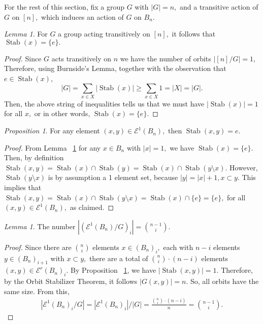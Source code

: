 \documentclass[10 pt]{amsart}
\theoremstyle{plain}
\theoremstyle{definition}
\theoremstyle{remark}
\numberwithin{equation}{section}
\newtheorem{lem}[thm]{Lemma}
\newtheorem{prop}[thm]{Proposition}
\theoremstyle{remark}
\def\Stab{\operatorname{Stab}}
\begin{document}
For the rest of this section, fix a group $G$ with $|G| = n,$ and a transitive action of $G$ on $[n],$ which induces an action of $G$ on $B_n.$

\begin{lem}
\label{lem:stabilizer_one}
For $G$ a group acting transitively on $[n],$ it follows that $\Stab(x) = \{e\}.$
\end{lem}
\begin{proof}
Since $G$ acts transitively on $n$ we have the number of orbits $|[n]/G| = 1,$ Therefore, using Burnside's Lemma, together with the observation that $e \in \Stab(x)$,
$$|G| = \sum_{x\in X}|\Stab(x)|\geq \sum_{x \in X} 1=|X|= |G|.$$
Then, the above string of inequalities tells us that we must have $|\Stab(x)| = 1$ for all $x,$ or in other words, $\Stab(x) = \{e\}.$
\end{proof}

\begin{prop}
\label{prop:stabilizer_edge}
For any element $(x , y) \in \mathcal E^1(B_n),$ then $\Stab(x, y) = e.$
\end{prop}
\begin{proof}
From Lemma ~\ref{lem:stabilizer_one} for any $x \in B_n$ with $|x| = 1,$ we have $\Stab(x) = \{e\}.$ Then, by definition $\Stab(x, y) = \Stab(x) \cap \Stab(y) = \Stab(x) \cap \Stab(y \setminus x).$ However, $\Stab(y \setminus x)$ is by assumption a 1 element set, because $|y| = |x| +1,x \subset y.$ This implies that $\Stab(x, y)=\Stab(x) \cap \Stab(y \setminus x) = \Stab(x) \cap \{e\} = \{e\},$ for all $(x, y) \in \mathcal E^1(B_n),$ as claimed.
\end{proof}

\begin{lem}
\label{lem:q_counts}
The number $|(\mathcal E^1(B_n)/G)_i| = \binom{n-1}{i}.$
\end{lem}
\begin{proof}
Since there are $\binom{n}{i}$ elements $x\in(B_n)_i,$ each with $n-i$ elements $y \in (B_n)_{i+1}$ with $x \subset y,$ there are a total of $\binom{n}{i}\cdot (n-i)$ elements $(x, y) \in \mathcal E^r(B_n)_i.$ By Proposition ~\ref{prop:stabilizer_edge}, we have $|\Stab(x, y)| = 1.$ Therefore, by the Orbit Stabilizer Theorem, it follows $|G(x, y)| = n.$ So, all orbits have the same size. From this,
\begin{align*}
|\mathcal E^1(B_n)_i/G| = |\mathcal E^1(B_n)_i|/|G| = \frac{\binom{n}{i}\cdot (n-i)}{n} = \binom {n-1}{i}.
\end{align*}
\end{proof}
\end{document}
